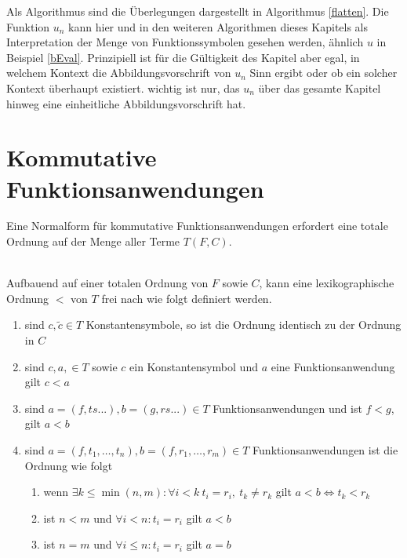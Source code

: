 Als Algorithmus sind die Überlegungen dargestellt in Algorithmus \ref{flatten}.
Die Funktion $u_n$ kann hier und in den weiteren Algorithmen dieses Kapitels als \grqq{} Interpretation der Menge von Funktionssymbolen gesehen werden, ähnlich $u$ in Beispiel \ref{bEval}. Prinzipiell ist für die Gültigkeit des Kapitel aber egal, in welchem Kontext die Abbildungsvorschrift von $u_n$ Sinn ergibt oder ob ein solcher Kontext überhaupt existiert. wichtig ist nur, das $u_n$ über das gesamte Kapitel hinweg eine einheitliche Abbildungsvorschrift hat.

\begin{algorithm}
\DontPrintSemicolon
\caption{$\mathrm{flatten} \colon T \rightarrow T$}\label{flatten}

\end{algorithm}

\section{Kommutative Funktionsanwendungen} \label{subsecNormalSortieren}
Eine Normalform für kommutative Funktionsanwendungen erfordert eine totale Ordnung auf der Menge aller Terme $T(F, C)$. 

\begin{definition}~\\ \label{defOrdnungKleiner}
Aufbauend auf einer totalen Ordnung von $F$ sowie $C$, kann eine lexikographische Ordnung $<$ von $T$ frei nach \cite{LexikografischeOrdnung} wie folgt definiert werden. 
\begin{enumerate}
	\item{sind $c, \tilde{c} \in T$ Konstantensymbole, so ist die Ordnung identisch zu der Ordnung in $C$}
	\item{sind $c, a, \in T$ sowie $c$ ein Konstantensymbol und $a$ eine Funktionsanwendung gilt $c < a$ }
	\item{sind $a = (f, ts...), b = (g, rs...) \in T$ Funktionsanwendungen und ist $f < g$, gilt $a < b$}
	\item{sind $a = (f, t_1, \dots, t_n), b = (f, r_1, \dots, r_m) \in T$ Funktionsanwendungen ist die Ordnung wie folgt}
	\begin{enumerate}
		\item{wenn $\exists k \leq \min{(n, m)} \colon \forall i < k ~ t_i = r_i ,~ t_k \neq r_k $ gilt ${a < b \iff t_k < r_k}$}
		\item{ist $n < m$ und $\forall i < n\colon t_i = r_i$ gilt $a < b$}
		\item{ist $n = m$ und $\forall i \leq n\colon t_i = r_i$ gilt $a = b$}
	\end{enumerate}
\end{enumerate}

\end{definition}

